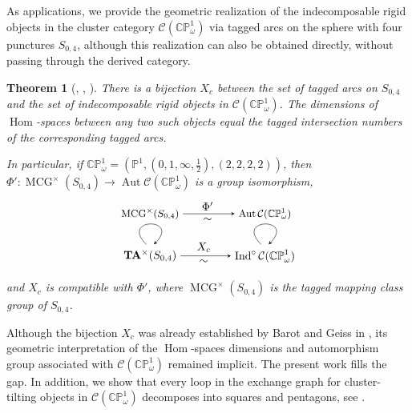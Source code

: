 \documentclass[11pt,a4paper,reqno]{amsart}%
\theoremstyle{plain}
\newtheorem{theorem}{Theorem}[section]
\theoremstyle{definition}
\numberwithin{equation}{section}
\numberwithin{equation}{section}
\newcommand{\Hom}{\operatorname{Hom}\nolimits}
\newcommand{\Ind}{\operatorname{Ind}\nolimits}
\def\wt{\omega}
\newcommand{\MCG}{\operatorname{MCG}}
\def\Aut{\operatorname{Aut}}
\def\Ind{\operatorname{Ind}}
\def\Hom{\operatorname{Hom}}
\def\CPone{\mathbb{CP}^1_{\wt}}
\def\CCP{\mathcal{C}(\CPone)}
\def\TA{\mathbf{T}\mathbf{A}}
\begin{document}
As applications, we provide the geometric realization of the indecomposable rigid objects in the cluster category $\CCP$ via tagged arcs on the sphere with four punctures $S_{0,4}$, although this realization can also be obtained directly, without passing through the derived category.
\begin{theorem}[{, , }]
There is a bijection $X_c$ between the set of tagged arcs on $S_{0,4}$ and the set of indecomposable rigid objects in $\CCP$.  The dimensions of $\Hom$-spaces between any two such objects equal the tagged intersection numbers of the corresponding tagged arcs. 

In particular, if $\CPone=(\mathbb{P}^1,(0,1,\infty,\frac{1}{2}),(2,2,2,2))$, then $\Phi': \MCG^\times  (S_{0,4})\to \Aut\CCP$ is a group isomorphism, 
\begin{equation}
\begin{tikzpicture}[xscale=.6,yscale=.6]
\draw(180:3)node(o){$\TA^\times(S_{0,4})$}(-3,2.2)node(b){\small{$ \MCG^\times  (S_{0,4})$}}
(-.2,.45)node{$X_c$} (-.2,-.3)node{$\sim$};
\draw(0:3)node(a){$\Ind^\circ\CCP$}(3,2.2)node(s){\small{$\Aut\CCP$}};
\draw[->,>=stealth](o)to(a);\draw[->,>=stealth](b)to(s);
\draw[->,>=stealth](-3.2,.6).. controls +(135:2) and +(45:2) ..(-3+.2,.6);
\draw[->,>=stealth](3-.2,.6).. controls +(135:2) and +(45:2) ..(3+.2,.6);
\draw (0,2.6)node{$\Phi'$} (0,1.9)node{$\sim$};
\end{tikzpicture}
\end{equation}
and $X_c$ is compatible with $\Phi'$, where $\MCG^\times  (S_{0,4})$ is the tagged mapping class group of $S_{0,4}$.
\end{theorem}
Although  the bijection $X_c$ was  already established by  Barot and Geiss in  \cite{BG}, its geometric interpretation of the $\Hom$-spaces  dimensions and automorphism group associated with $\CCP$ remained implicit.
The present work  fills the gap. In addition, we show  that every loop in    the exchange graph for cluster-tilting objects in $\CCP$ decomposes into squares and pentagons, see .
  
 

\end{document}
